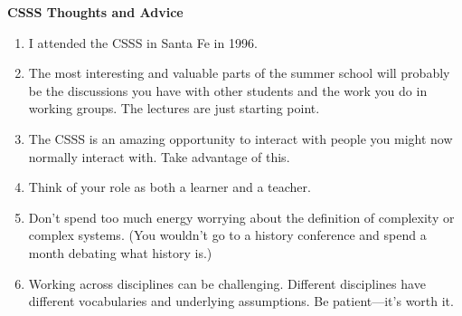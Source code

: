 \documentclass[%
  color,
  epsf,
  url,
  amssymb,
  semhelv,%
  portrait,%
  semlayer%
  ]{seminar}
\begin{document}
\begin{slide*}
\centerslidesfalse
\begin{center}
{\bf CSSS Thoughts and Advice}
\end{center}

\begin{enumerate}

\item I attended the CSSS in Santa Fe in 1996.

\item The most interesting and valuable parts of the summer school
will probably be the discussions you have with other students and the
work you do in working groups.  The lectures are just starting point.

\item The CSSS is an amazing opportunity to interact with people you
might now normally interact with.  Take advantage of this.  

\item Think of your role as both a learner and a teacher. 

\item Don't spend too much energy worrying about the definition of
complexity or complex systems.  (You wouldn't go to a history
conference and spend a month debating what history is.)

\item Working across disciplines can be challenging.  Different
disciplines have different vocabularies and underlying assumptions.
Be patient---it's worth it.

\end{enumerate}


\end{slide*}
\end{document}
